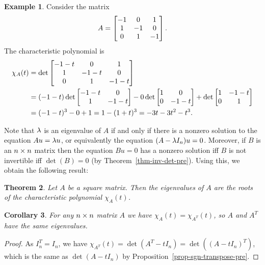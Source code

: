 \documentclass[reqno]{amsart}
\newtheorem{theorem}{Theorem}[section]
\newtheorem{corollary}[theorem]{Corollary}
\theoremstyle{definition}
\newtheorem{example}[theorem]{Example}
\begin{document}
\begin{example}\label{eg-chi-three}
 Consider the matrix
 \[ A = \left[\begin{matrix} -1 & 0 & 1 \\ 1 & -1 & 0 \\ 0 & 1 & -1 \end{matrix}\right]. \]
 The characteristic polynomial is
 \begin{align*}
  \chi_A(t) &=
   \det \left[\begin{matrix} -1-t & 0 & 1 \\ 1 & -1-t & 0 \\ 0 & 1 & -1-t \end{matrix}\right] \\
   &= (-1-t) \det \left[\begin{matrix} -1-t & 0 \\ 1 & -1-t \end{matrix}\right]
      - 0 \det \left[\begin{matrix} 1 & 0 \\ 0 & -1-t \end{matrix}\right]
      + \det \left[\begin{matrix} 1 & -1-t \\ 0 & 1 \end{matrix}\right] \\
   &= (-1-t)^3  - 0 + 1 = 1-(1+t)^3
    = -3t-3t^2-t^3.
 \end{align*}
\end{example}

Note that $\lambda$ is an eigenvalue of $A$ if and only if there is a
nonzero solution to the equation $Au=\lambda u$, or equivalently the
equation $(A-\lambda I_n)u=0$.  Moreover, if $B$ is an $n\times n$ matrix
then the equation $Bu=0$ has a nonzero solution iff $B$ is
not invertible iff $\det(B)=0$ (by Theorem~\ref{thm-inv-det-pre}).
Using this, we obtain the following result:
\begin{theorem}\label{thm-chi-roots}
 Let $A$ be a square matrix.  Then the eigenvalues of $A$ are the
 roots of the characteristic polynomial $\chi_A(t)$.
\end{theorem}

\begin{corollary}\label{cor-eigen-transpose}
 For any $n\times n$ matrix $A$ we have $\chi_A(t)=\chi_{A^T}(t)$, so $A$
 and $A^T$ have the same eigenvalues.
\end{corollary}
\begin{proof}
 As $I_n^T=I_n$, we have
 $\chi_{A^T}(t)=\det(A^T-tI_n)=\det((A-tI_n)^T)$, which is the same as
 $\det(A-tI_n)$ by Proposition~\ref{prop-sgn-transpose-pre}.
\end{proof}
\end{document}

